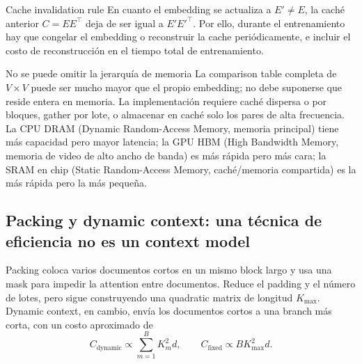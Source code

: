 
\begin{importantbox}{Cache invalidation rule}
En cuanto el embedding se actualiza a $E'\neq E$, la caché anterior $C=EE^\top$ deja de ser igual a $E'E'^\top$. Por ello, durante el entrenamiento hay que congelar el embedding o reconstruir la cache periódicamente, e incluir el costo de reconstrucción en el tiempo total de entrenamiento.
\end{importantbox}

\begin{knowledgebox}{No se puede omitir la jerarquía de memoria}
La comparison table completa de $V\times V$ puede ser mucho mayor que el propio embedding; no debe suponerse que reside entera en memoria. La implementación requiere caché dispersa o por bloques, gather por lote, o almacenar en caché solo los pares de alta frecuencia. La CPU DRAM (Dynamic Random-Access Memory, memoria principal) tiene más capacidad pero mayor latencia; la GPU HBM (High Bandwidth Memory, memoria de video de alto ancho de banda) es más rápida pero más cara; la SRAM en chip (Static Random-Access Memory, caché/memoria compartida) es la más rápida pero la más pequeña.
\end{knowledgebox}


\subsection{Packing y dynamic context: una técnica de eficiencia no es un context model}

Packing coloca varios documentos cortos en un mismo block largo y usa una mask para impedir la attention entre documentos. Reduce el padding y el número de lotes, pero sigue construyendo una quadratic matrix de longitud $K_{\max}$. Dynamic context, en cambio, envía los documentos cortos a una branch más corta, con un costo aproximado de
\[
C_{\text{dynamic}}\propto \sum_{m=1}^{B}K_m^2d,
\qquad
C_{\text{fixed}}\propto BK_{\max}^2d.
\]

